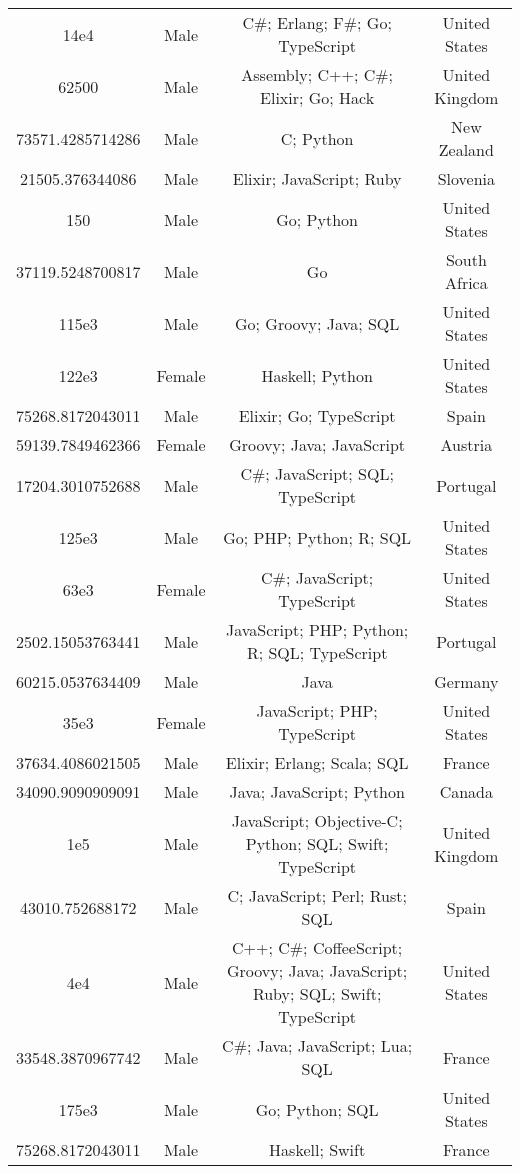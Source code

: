 \begin{center}
\begin{tabular}{ |c|c|c|c| }
14e4  &  Male  &  C\#; Erlang; F\#; Go; TypeScript  &  United States  \\ 
62500  &  Male  &  Assembly; C++; C\#; Elixir; Go; Hack  &  United Kingdom  \\ 
73571.4285714286  &  Male  &  C; Python  &  New Zealand  \\ 
21505.376344086  &  Male  &  Elixir; JavaScript; Ruby  &  Slovenia  \\ 
150  &  Male  &  Go; Python  &  United States  \\ 
37119.5248700817  &  Male  &  Go  &  South Africa  \\ 
115e3  &  Male  &  Go; Groovy; Java; SQL  &  United States  \\ 
122e3  &  Female  &  Haskell; Python  &  United States  \\ 
75268.8172043011  &  Male  &  Elixir; Go; TypeScript  &  Spain  \\ 
59139.7849462366  &  Female  &  Groovy; Java; JavaScript  &  Austria  \\ 
17204.3010752688  &  Male  &  C\#; JavaScript; SQL; TypeScript  &  Portugal  \\ 
125e3  &  Male  &  Go; PHP; Python; R; SQL  &  United States  \\ 
63e3  &  Female  &  C\#; JavaScript; TypeScript  &  United States  \\ 
2502.15053763441  &  Male  &  JavaScript; PHP; Python; R; SQL; TypeScript  &  Portugal  \\ 
60215.0537634409  &  Male  &  Java  &  Germany  \\ 
35e3  &  Female  &  JavaScript; PHP; TypeScript  &  United States  \\ 
37634.4086021505  &  Male  &  Elixir; Erlang; Scala; SQL  &  France  \\ 
34090.9090909091  &  Male  &  Java; JavaScript; Python  &  Canada  \\ 
1e5  &  Male  &  JavaScript; Objective-C; Python; SQL; Swift; TypeScript  &  United Kingdom  \\ 
43010.752688172  &  Male  &  C; JavaScript; Perl; Rust; SQL  &  Spain  \\ 
4e4  &  Male  &  C++; C\#; CoffeeScript; Groovy; Java; JavaScript; Ruby; SQL; Swift; TypeScript  &  United States  \\ 
33548.3870967742  &  Male  &  C\#; Java; JavaScript; Lua; SQL  &  France  \\ 
175e3  &  Male  &  Go; Python; SQL  &  United States  \\ 
75268.8172043011  &  Male  &  Haskell; Swift  &  France  \\ 

\end{tabular}
\end{center}
